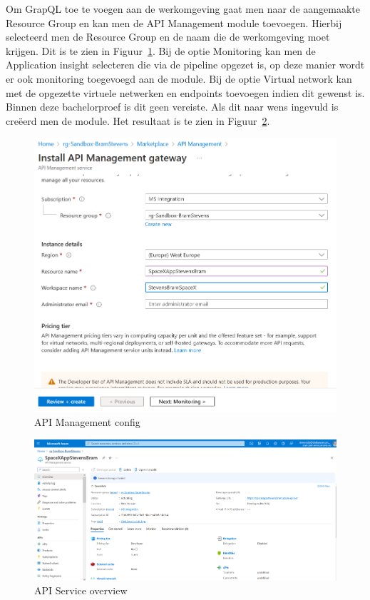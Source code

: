 Om GrapQL toe te voegen aan de werkomgeving gaat men naar de aangemaakte Resource Group en kan men de API Management module toevoegen.
Hierbij selecteerd men de Resource Group en de naam die de werkomgeving moet krijgen. Dit is te zien in Figuur~\ref{fig:APIM}.
Bij de optie Monitoring kan men de Application insight selecteren die via de pipeline opgezet is, op deze manier wordt er ook monitoring toegevoegd aan de module. Bij de optie Virtual network kan met de opgezette virtuele netwerken en endpoints toevoegen indien dit gewenst is. Binnen deze bachelorproef is dit geen vereiste. Als dit naar wens ingevuld is creëerd men de module. Het resultaat is te zien in Figuur~\ref{fig:APIS}.

\begin{figure}
    \centering
    \includegraphics[scale=0.60]{../img/APIManagement.png}
    \caption{\label{fig:APIM}API Management config}
\end{figure}

\begin{figure}
    \centering
    \includegraphics[scale=0.40]{../img/APIService.png}
    \caption{\label{fig:APIS}API Service overview}
\end{figure}

